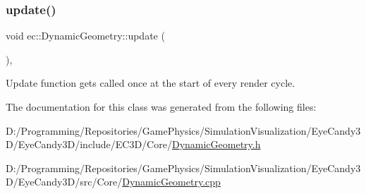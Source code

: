 \subsubsection{\texorpdfstring{update()}{update()}}
{\footnotesize\ttfamily void ec\+::\+Dynamic\+Geometry\+::update (\begin{DoxyParamCaption}{ }\end{DoxyParamCaption})\hspace{0.3cm}{\ttfamily [protected]}, {\ttfamily [virtual]}}



Update function gets called once at the start of every render cycle. 



The documentation for this class was generated from the following files\+:\begin{DoxyCompactItemize}
\item 
D\+:/\+Programming/\+Repositories/\+Game\+Physics/\+Simulation\+Visualization/\+Eye\+Candy3\+D/\+Eye\+Candy3\+D/include/\+E\+C3\+D/\+Core/\mbox{\hyperlink{_dynamic_geometry_8h}{Dynamic\+Geometry.\+h}}\item 
D\+:/\+Programming/\+Repositories/\+Game\+Physics/\+Simulation\+Visualization/\+Eye\+Candy3\+D/\+Eye\+Candy3\+D/src/\+Core/\mbox{\hyperlink{_dynamic_geometry_8cpp}{Dynamic\+Geometry.\+cpp}}\end{DoxyCompactItemize}
